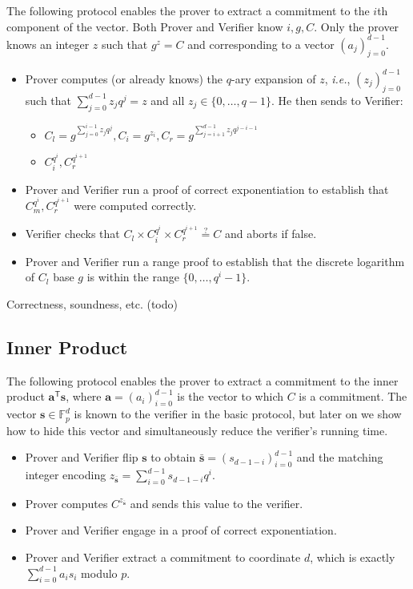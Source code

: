 \documentclass{article}
\theoremstyle{definition}
\begin{document}
The following protocol enables the prover to extract a commitment to the $i$th component of the vector. Both Prover and Verifier know $i, g, C$. Only the prover knows an integer $z$ such that $g^z = C$ and corresponding to a vector $(a_j)_{j=0}^{d-1}$.
\begin{itemize}
\item Prover computes (or already knows) the $q$-ary expansion of $z$, \emph{i.e.}, $(z_j)_{j=0}^{d-1}$ such that $\sum_{j=0}^{d-1} z_j q^j = z$ and all $z_j \in \{0,\ldots, q-1\}$. He then sends to Verifier:
\begin{itemize}
\item $C_l = g^{\sum_{j=0}^{i-1} z_jq^j}, C_i = g^{z_i}, C_r = g^{\sum_{j=i+1}^{d-1} z_j q^{j-i-1}}$
\item $C_i^{q^i}, C_r^{q^{i+1}}$
\end{itemize}
\item Prover and Verifier run a proof of correct exponentiation to establish that $C_m^{q^i}, C_r^{q^{i+1}}$ were computed correctly.
\item Verifier checks that $C_l \times C_i^{q^i} \times C_r^{q^{i+1}} \stackrel{?}{=} C$ and aborts if false.
\item Prover and Verifier run a range proof to establish that the discrete logarithm of $C_l$ base $g$ is within the range $\{0, \ldots, q^i-1\}$.
\end{itemize}

Correctness, soundness, etc. (todo)

\subsection{Inner Product}
\label{section:inner_product}

The following protocol enables the prover to extract a commitment to the inner product $\mathbf{a}^\mathsf{T} \mathbf{s}$, where $\mathbf{a} = (a_i)_{i=0}^{d-1}$ is the vector to which $C$ is a commitment. The vector $\mathbf{s} \in \mathbb{F}_p^d$ is known to the verifier in the basic protocol, but later on we show how to hide this vector and simultaneously reduce the verifier's running time.
\begin{itemize}
\item Prover and Verifier flip $\mathbf{s}$ to obtain $\bar{\mathbf{s}} = (s_{d-1-i})_{i=0}^{d-1}$ and the matching integer encoding $z_{\bar{\mathbf{s}}} = \sum_{i=0}^{d-1} s_{d-1-i} q^i$.
\item Prover computes $C^{z_{\bar{\mathbf{s}}}}$ and sends this value to the verifier.
\item Prover and Verifier engage in a proof of correct exponentiation.
\item Prover and Verifier extract a commitment to coordinate $d$, which is exactly $\sum_{i=0}^{d-1} a_is_i$ modulo $p$.
\end{itemize}
\end{document}
